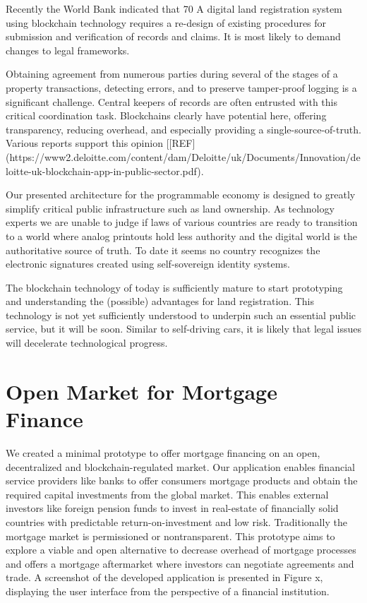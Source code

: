 \documentclass[USenglish]{article}
\begin{document}
Recently the World Bank indicated that 70%
A digital land registration system using blockchain technology requires a re-design of existing procedures for submission and verification of records and claims.
It is most likely to demand changes to legal frameworks.

Obtaining agreement from numerous parties during several of the stages of a property transactions, detecting errors, and to preserve tamper-proof logging is a significant challenge.
Central keepers of records are often entrusted with this critical coordination task.
Blockchains clearly have potential here, offering transparency, reducing overhead, and especially providing a single-source-of-truth.
Various reports support this opinion [[REF](https://www2.deloitte.com/content/dam/Deloitte/uk/Documents/Innovation/deloitte-uk-blockchain-app-in-public-sector.pdf).

Our presented architecture for the programmable economy is designed to greatly simplify critical public infrastructure such as land ownership.
As technology experts we are unable to judge if laws of various countries are ready to transition to a world where analog printouts hold less authority and the digital world is the authoritative source of truth.
To date it seems no country recognizes the electronic signatures created using self-sovereign identity systems.

The blockchain technology of today is sufficiently mature to start prototyping and understanding the (possible) advantages for land registration. 
This technology is not yet sufficiently understood to underpin such an essential public service, but it will be soon.
Similar to self-driving cars, it is likely that legal issues will decelerate technological progress.

\section{Open Market for Mortgage Finance}

We created a minimal prototype to offer mortgage financing on an open, decentralized and blockchain-regulated market.
Our application enables financial service providers like banks to offer consumers mortgage products and obtain the required capital investments from the global market.
This enables external investors like foreign pension funds to invest in real-estate of financially solid countries with predictable return-on-investment and low risk.
Traditionally the mortgage market is permissioned or nontransparent.
This prototype aims to explore a viable and open alternative to decrease overhead of mortgage processes and offers a mortgage aftermarket where investors can negotiate agreements and trade.
A screenshot of the developed application is presented in Figure x, displaying the user interface from the perspective of a financial institution.
\end{document}
